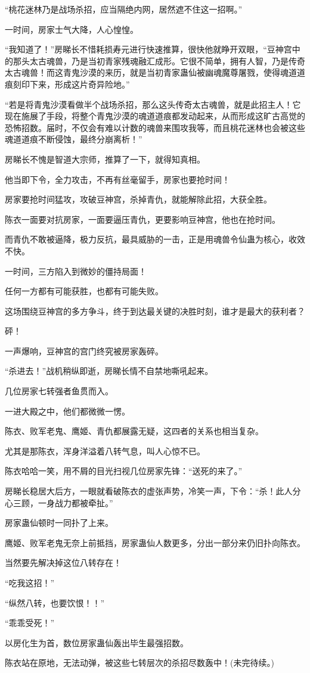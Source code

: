\begin{this_body}
“桃花迷林乃是战场杀招，应当隔绝内网，居然遮不住这一招啊。”

一时间，房家士气大降，人心惶惶。

“我知道了！”房睇长不惜耗损寿元进行快速推算，很快他就睁开双眼，“豆神宫中的那头太古魂兽，乃是当初青家残魂融汇成形。它很不简单，拥有人智，乃是传奇太古魂兽！而这青鬼沙漠的来历，就是当初青家蛊仙被幽魂魔尊屠戮，使得魂道道痕刻印下来，形成这片奇异险地。”

“若是将青鬼沙漠看做半个战场杀招，那么这头传奇太古魂兽，就是此招主人！它现在施展了手段，将整个青鬼沙漠的魂道道痕都发动起来，从而形成这旷古高觉的恐怖招数。届时，不仅会有难以计数的魂兽来围攻我等，而且桃花迷林也会被这些魂道道痕不断侵蚀，最终分崩离析！”

房睇长不愧是智道大宗师，推算了一下，就得知真相。

他当即下令，全力攻击，不再有丝毫留手，房家也要抢时间！

房家要抢时间猛攻，攻破豆神宫，杀掉青仇，就能解除此招，大获全胜。

陈衣一面要对抗房家，一面要逼压青仇，更要影响豆神宫，他也在抢时间。

而青仇不敢被逼降，极力反抗，最具威胁的一击，正是用魂兽令仙蛊为核心，收效不快。

一时间，三方陷入到微妙的僵持局面！

任何一方都有可能获胜，也都有可能失败。

这场围绕豆神宫的多方争斗，终于到达最关键的决胜时刻，谁才是最大的获利者？

砰！

一声爆响，豆神宫的宫门终究被房家轰碎。

“杀进去！”战机稍纵即逝，房睇长情不自禁地嘶吼起来。

几位房家七转强者鱼贯而入。

一进大殿之中，他们都微微一愣。

陈衣、败军老鬼、鹰姬、青仇都展露无疑，这四者的关系也相当复杂。

尤其是那陈衣，浑身洋溢着八转气息，叫人心惊不已。

陈衣哈哈一笑，用不屑的目光扫视几位房家先锋：“送死的来了。”

房睇长稳居大后方，一眼就看破陈衣的虚张声势，冷笑一声，下令：“杀！此人分心三顾，一身战力都被牵扯。”

房家蛊仙顿时一同扑了上来。

鹰姬、败军老鬼无奈上前抵挡，房家蛊仙人数更多，分出一部分来仍旧扑向陈衣。

当然要先解决掉这位八转存在！

“吃我这招！”

“纵然八转，也要饮恨！！”

“乖乖受死！”

以房化生为首，数位房家蛊仙轰出毕生最强招数。

陈衣站在原地，无法动弹，被这些七转层次的杀招尽数轰中！(未完待续。)

\end{this_body}

